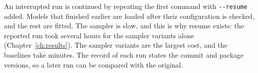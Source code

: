 An interrupted run is continued by repeating the first command with \texttt{-{}-resume} added. Models that
finished earlier are loaded after their configuration is checked, and the rest are fitted. The sampler is
slow, and this is why resume exists: the reported run took several hours for the sampler variants alone
(Chapter~\ref{ch:results}). The sampler variants are the largest cost, and the baselines take minutes.
The record of each run states the commit and package versions, so a later run can be compared with the
original.
